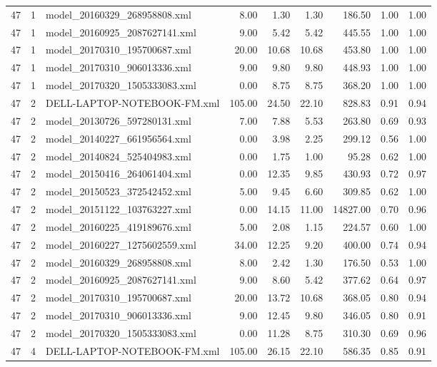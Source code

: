 \begin{table}[ht]
\begin{tabular}{rrlrrrrrr}
   47 &   1 & model\_20160329\_268958808.xml & 8.00 & 1.30 & 1.30 & 186.50 & 1.00 & 1.00 \\ 
   47 &   1 & model\_20160925\_2087627141.xml & 9.00 & 5.42 & 5.42 & 445.55 & 1.00 & 1.00 \\ 
   47 &   1 & model\_20170310\_195700687.xml & 20.00 & 10.68 & 10.68 & 453.80 & 1.00 & 1.00 \\ 
   47 &   1 & model\_20170310\_906013336.xml & 9.00 & 9.80 & 9.80 & 448.93 & 1.00 & 1.00 \\ 
   47 &   1 & model\_20170320\_1505333083.xml & 0.00 & 8.75 & 8.75 & 368.20 & 1.00 & 1.00 \\ 
   47 &   2 & DELL-LAPTOP-NOTEBOOK-FM.xml & 105.00 & 24.50 & 22.10 & 828.83 & 0.91 & 0.94 \\ 
   47 &   2 & model\_20130726\_597280131.xml & 7.00 & 7.88 & 5.53 & 263.80 & 0.69 & 0.93 \\ 
   47 &   2 & model\_20140227\_661956564.xml & 0.00 & 3.98 & 2.25 & 299.12 & 0.56 & 1.00 \\ 
   47 &   2 & model\_20140824\_525404983.xml & 0.00 & 1.75 & 1.00 & 95.28 & 0.62 & 1.00 \\ 
   47 &   2 & model\_20150416\_264061404.xml & 0.00 & 12.35 & 9.85 & 430.93 & 0.72 & 0.97 \\ 
   47 &   2 & model\_20150523\_372542452.xml & 5.00 & 9.45 & 6.60 & 309.85 & 0.62 & 1.00 \\ 
   47 &   2 & model\_20151122\_103763227.xml & 0.00 & 14.15 & 11.00 & 14827.00 & 0.70 & 0.96 \\ 
   47 &   2 & model\_20160225\_419189676.xml & 5.00 & 2.08 & 1.15 & 224.57 & 0.60 & 1.00 \\ 
   47 &   2 & model\_20160227\_1275602559.xml & 34.00 & 12.25 & 9.20 & 400.00 & 0.74 & 0.94 \\ 
   47 &   2 & model\_20160329\_268958808.xml & 8.00 & 2.42 & 1.30 & 176.50 & 0.53 & 1.00 \\ 
   47 &   2 & model\_20160925\_2087627141.xml & 9.00 & 8.60 & 5.42 & 377.62 & 0.64 & 0.97 \\ 
   47 &   2 & model\_20170310\_195700687.xml & 20.00 & 13.72 & 10.68 & 368.05 & 0.80 & 0.94 \\ 
   47 &   2 & model\_20170310\_906013336.xml & 9.00 & 12.45 & 9.80 & 346.05 & 0.80 & 0.91 \\ 
   47 &   2 & model\_20170320\_1505333083.xml & 0.00 & 11.28 & 8.75 & 310.30 & 0.69 & 0.96 \\ 
   47 &   4 & DELL-LAPTOP-NOTEBOOK-FM.xml & 105.00 & 26.15 & 22.10 & 586.35 & 0.85 & 0.91 \\ 

\end{tabular}
\end{table}

